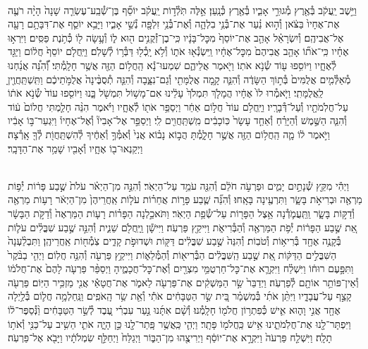 \documentclass[twoside, openany, parskip=half, 11pt]{book}
\begin{document}
\begin{footnotesize}
\begin{multicols}{2}
\\
וַיֵּ֣שֶׁב יַֽעֲקֹ֔ב בְּ֯אֶ֖רֶץ מְ֯גוּרֵ֣י אָבִ֑יו בְּ֯אֶ֖רֶץ כְּ֯נָֽעַן׃ אֵ֣לֶּה תֹּֽלְ֯ד֣וֹת יַֽעֲקֹ֗ב יוֹסֵ֞ף בֶּן־שְׁ֯בַֽע־עֶשְׂרֵ֤ה שָׁנָה֙ הָיָ֨ה רֹעֶ֤ה אֶת־אֶחָיו֙ בַּצֹּ֔אן וְ֯ה֣וּא נַ֗עַר אֶת־בְּ֯נֵ֥י בִלְהָ֛ה וְ֯אֶת־בְּ֯נֵ֥י זִלְפָּ֖ה נְ֯שֵׁ֣י אָבִ֑יו וַיָּבֵ֥א יוֹסֵ֛ף אֶת־דִּבָּתָ֥ם רָעָ֖ה אֶל־אֲבִיהֶֽם׃ וְ֯יִשְׂרָאֵ֗ל אָהַ֤ב אֶת־יוֹסֵף֙ מִכׇּל־בָּנָ֔יו כִּֽי־בֶן־זְ֯קֻנִ֥ים ה֖וּא ל֑וֹ וְ֯עָ֥שָׂה ל֖וֹ כְּ֯תֹ֥נֶת פַּסִּֽים׃  וַיִּרְא֣וּ אֶחָ֗יו כִּֽי־אֹת֞וֹ אָהַ֤ב אֲבִיהֶם֙ מִכׇּל־אֶחָ֔יו וַֽיִּשְׂנְ֯א֖וּ אֹת֑וֹ וְ֯לֹ֥א יָֽכְ֯ל֖וּ דַּבְּ֯ר֥וֹ לְ֯שָׁלֹֽם׃ וַיַּֽחֲלֹ֤ם יוֹסֵף֙ חֲל֔וֹם וַיַּגֵּ֖ד לְ֯אֶחָ֑יו וַיּוֹסִ֥פוּ ע֖וֹד שְׂ֯נֹ֥א אֹתֽוֹ׃ וַיֹּ֖אמֶר אֲלֵיהֶ֑ם שִׁמְעוּ־נָ֕א הַֽחֲל֥וֹם הַזֶּ֖ה אֲשֶׁ֥ר חָלָֽמְ֯תִּי׃ וְ֠֯הִנֵּ֠ה אֲנַ֜חְנוּ מְ֯אַלְּ֯מִ֤ים אֲלֻמִּים֙ בְּ֯ת֣וֹךְ הַשָּׂדֶ֔ה וְ֯הִנֵּ֛ה קָ֥מָה אֲלֻמָּתִ֖י וְ֯גַם־נִצָּ֑בָה וְ֯הִנֵּ֤ה תְ֯סֻבֶּ֨ינָה֙ אֲלֻמֹּ֣תֵיכֶ֔ם וַתִּֽשְׁתַּֽחֲוֶ֖יןָ לַֽאֲלֻמָּתִֽי׃  וַיֹּ֤אמְ֯רוּ לוֹ֙ אֶחָ֔יו הֲמָלֹ֤ךְ תִּמְלֹךְ֙ עָלֵ֔ינוּ אִם־מָשׁ֥וֹל תִּמְשֹׁ֖ל בָּ֑נוּ וַיּוֹסִ֤פוּ עוֹד֙ שְׂ֯נֹ֣א אֹת֔וֹ עַל־חֲלֹֽמֹתָ֖יו וְ֯עַל־דְּ֯בָרָֽיו׃ וַיַּֽחֲלֹ֥ם עוֹד֙ חֲל֣וֹם אַחֵ֔ר וַיְסַפֵּ֥ר אֹת֖וֹ לְ֯אֶחָ֑יו וַיֹּ֗אמֶר הִנֵּ֨ה חָלַ֤מְתִּי חֲלוֹם֙ ע֔וֹד וְ֯הִנֵּ֧ה הַשֶּׁ֣מֶשׁ וְ֯הַיָּרֵ֗חַ וְ֯אַחַ֤ד עָשָׂר֙ כּֽוֹכָבִ֔ים מִֽשְׁתַּֽחֲוִ֖ים לִֽי׃ וַיְסַפֵּ֣ר אֶל־אָבִיו֘ וְ֯אֶל־אֶחָיו֒ וַיִּגְעַר־בּ֣וֹ אָבִ֔יו וַיֹּ֣אמֶר ל֔וֹ מָ֛ה הַֽחֲל֥וֹם הַזֶּ֖ה אֲשֶׁ֣ר חָלָ֑מְ֯תָּ הֲב֣וֹא נָב֗וֹא אֲנִי֙ וְ֯אִמְּ֯ךָ֣ וְ֯אַחֶ֔יךָ לְ֯הִשְׁתַּֽחֲוֹ֖ת לְ֯ךָ֖ אָֽרְ֯צָה׃ וַיְקַנְאוּ־ב֖וֹ אֶחָ֑יו וְ֯אָבִ֖יו שָׁמַ֥ר אֶת־הַדָּבָֽר׃

\\
וַיְהִ֕י מִקֵּ֖ץ שְׁ֯נָתַ֣יִם יָמִ֑ים וּפַרְעֹ֣ה חֹלֵ֔ם וְ֯הִנֵּ֖ה עֹמֵ֥ד עַל־הַיְאֹֽר׃ וְ֯הִנֵּ֣ה מִן־הַיְאֹ֗ר עֹלֹת֙ שֶׁ֣בַע פָּר֔וֹת יְ֯פ֥וֹת מַרְאֶ֖ה וּבְרִיאֹ֣ת בָּשָׂ֑ר וַתִּרְעֶ֖ינָה בָּאָֽחוּ׃ וְ֯הִנֵּ֞ה שֶׁ֧בַע פָּר֣וֹת אֲחֵר֗וֹת עֹל֤וֹת אַֽחֲרֵיהֶן֙ מִן־הַיְאֹ֔ר רָע֥וֹת מַרְאֶ֖ה וְ֯דַקּ֣וֹת בָּשָׂ֑ר וַֽתַּֽעֲמֹ֛דְ֯נָה אֵ֥צֶל הַפָּר֖וֹת עַל־שְׂ֯פַ֥ת הַיְאֹֽר׃ וַתֹּאכַ֣לְנָה הַפָּר֗וֹת רָע֤וֹת הַמַּרְאֶה֙ וְ֯דַקֹּ֣ת הַבָּשָׂ֔ר אֵ֚ת שֶׁ֣בַע הַפָּר֔וֹת יְ֯פֹ֥ת הַמַּרְאֶ֖ה וְ֯הַבְּ֯רִיאֹ֑ת וַיִּיקַ֖ץ פַּרְעֹֽה׃  וַיִּישָׁ֕ן וַֽיַּֽחֲלֹ֖ם שֵׁנִ֑ית וְ֯הִנֵּ֣ה שֶׁ֣בַע שִׁבֳּלִ֗ים עֹל֛וֹת בְּ֯קָנֶ֥ה אֶחָ֖ד בְּ֯רִיא֥וֹת וְ֯טֹבֽוֹת׃ וְ֯הִנֵּה֙ שֶׁ֣בַע שִׁבֳּלִ֔ים דַּקּ֖וֹת וּשְׁדוּפֹ֣ת קָדִ֑ים צֹֽמְ֯ח֖וֹת אַֽחֲרֵיהֶֽן׃ וַתִּבְלַ֨עְנָה֙ הַשִּׁבֳּלִ֣ים הַדַּקּ֔וֹת אֵ֚ת שֶׁ֣בַע הַֽשִּׁבֳּלִ֔ים הַבְּ֯רִיא֖וֹת וְ֯הַמְּ֯לֵא֑וֹת וַיִּיקַ֥ץ פַּרְעֹ֖ה וְ֯הִנֵּ֥ה חֲלֽוֹם׃  וַיְהִ֤י בַבֹּ֨קֶר֙ וַתִּפָּ֣עֶם רוּח֔וֹ וַיִּשְׁלַ֗ח וַיִּקְרָ֛א אֶת־כׇּל־חַרְטֻמֵּ֥י מִצְרַ֖יִם וְ֯אֶת־כׇּל־חֲכָמֶ֑יהָ וַיְסַפֵּ֨ר פַּרְעֹ֤ה לָהֶם֙ אֶת־חֲלֹמ֔וֹ וְ֯אֵין־פּוֹתֵ֥ר אוֹתָ֖ם לְ֯פַרְעֹֽה׃ וַיְדַבֵּר֙ שַׂ֣ר הַמַּשְׁקִ֔ים אֶת־פַּרְעֹ֖ה לֵאמֹ֑ר אֶת־חֲטָאַ֕י אֲנִ֖י מַזְכִּ֥יר הַיּֽוֹם׃ פַּרְעֹ֖ה קָצַ֣ף עַל־עֲבָדָ֑יו וַיִּתֵּ֨ן אֹתִ֜י בְּ֯מִשְׁמַ֗ר בֵּ֚ית שַׂ֣ר הַטַּבָּחִ֔ים אֹתִ֕י וְ֯אֵ֖ת שַׂ֥ר הָֽאֹפִֽים׃ וַנַּֽחַלְמָ֥ה חֲל֛וֹם בְּ֯לַ֥יְלָה אֶחָ֖ד אֲנִ֣י וָה֑וּא אִ֛ישׁ כְּ֯פִתְר֥וֹן חֲלֹמ֖וֹ חָלָֽמְ֯נוּ׃ וְ֯שָׁ֨ם אִתָּ֜נוּ נַ֣עַר עִבְרִ֗י עֶ֚בֶד לְ֯שַׂ֣ר הַטַּבָּחִ֔ים וַ֨נְּ֯סַפֶּר־ל֔וֹ וַיִּפְתָּר־לָ֖נוּ אֶת־חֲלֹֽמֹתֵ֑ינוּ אִ֥ישׁ כַּֽחֲלֹמ֖וֹ פָּתָֽר׃ וַיְהִ֛י כַּֽאֲשֶׁ֥ר פָּֽתַר־לָ֖נוּ כֵּ֣ן הָיָ֑ה אֹתִ֛י הֵשִׁ֥יב עַל־כַּנִּ֖י וְ֯אֹת֥וֹ תָלָֽה׃ וַיִּשְׁלַ֤ח פַּרְעֹה֙ וַיִּקְרָ֣א אֶת־יוֹסֵ֔ף וַיְרִיצֻ֖הוּ מִן־הַבּ֑וֹר וַיְגַלַּח֙ וַיְחַלֵּ֣ף שִׂמְלֹתָ֔יו וַיָּבֹ֖א אֶל־פַּרְעֹֽה׃


\end{multicols}
\end{footnotesize}
\end{document}
